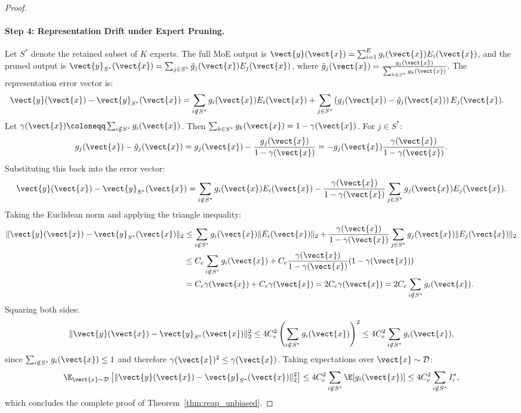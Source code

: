 \begin{proof}
\paragraph{Step 4: Representation Drift under Expert Pruning.}
Let $S^*$ denote the retained subset of $K$ experts.
The full MoE output is $\vect{y}(\vect{x}) = \sum_{i=1}^E g_i(\vect{x}) E_i(\vect{x})$, and the pruned output is $\vect{y}_{S^*}(\vect{x}) = \sum_{j \in S^*} \tilde{g}_j(\vect{x}) E_j(\vect{x})$, where $\tilde{g}_j(\vect{x}) = \frac{g_j(\vect{x})}{\sum_{k \in S^*} g_k(\vect{x})}$.
The representation error vector is:
\begin{align}
\vect{y}(\vect{x}) - \vect{y}_{S^*}(\vect{x}) &= \sum_{i \notin S^*} g_i(\vect{x}) E_i(\vect{x}) + \sum_{j \in S^*} \left( g_j(\vect{x}) - \tilde{g}_j(\vect{x}) \right) E_j(\vect{x}).
\end{align}
Let $\gamma(\vect{x}) \coloneqq \sum_{i \notin S^*} g_i(\vect{x})$. Then $\sum_{k \in S^*} g_k(\vect{x}) = 1 - \gamma(\vect{x})$.
For $j \in S^*$:
\begin{equation}
g_j(\vect{x}) - \tilde{g}_j(\vect{x}) = g_j(\vect{x}) - \frac{g_j(\vect{x})}{1 - \gamma(\vect{x})} = -g_j(\vect{x}) \frac{\gamma(\vect{x})}{1 - \gamma(\vect{x})}.
\end{equation}
Substituting this back into the error vector:
\begin{equation}
\vect{y}(\vect{x}) - \vect{y}_{S^*}(\vect{x}) = \sum_{i \notin S^*} g_i(\vect{x}) E_i(\vect{x}) - \frac{\gamma(\vect{x})}{1 - \gamma(\vect{x})} \sum_{j \in S^*} g_j(\vect{x}) E_j(\vect{x}).
\end{equation}
Taking the Euclidean norm and applying the triangle inequality:
\begin{align}
\|\vect{y}(\vect{x}) - \vect{y}_{S^*}(\vect{x})\|_2 &\le \sum_{i \notin S^*} g_i(\vect{x}) \|E_i(\vect{x})\|_2 + \frac{\gamma(\vect{x})}{1 - \gamma(\vect{x})} \sum_{j \in S^*} g_j(\vect{x}) \|E_j(\vect{x})\|_2 \nonumber \\
&\le C_e \sum_{i \notin S^*} g_i(\vect{x}) + C_e \frac{\gamma(\vect{x})}{1 - \gamma(\vect{x})} (1 - \gamma(\vect{x})) \nonumber \\
&= C_e \gamma(\vect{x}) + C_e \gamma(\vect{x}) = 2 C_e \gamma(\vect{x}) = 2 C_e \sum_{i \notin S^*} g_i(\vect{x}).
\end{align}
Squaring both sides:
\begin{equation}
\|\vect{y}(\vect{x}) - \vect{y}_{S^*}(\vect{x})\|_2^2 \le 4 C_e^2 \left( \sum_{i \notin S^*} g_i(\vect{x}) \right)^2 \le 4 C_e^2 \sum_{i \notin S^*} g_i(\vect{x}),
\end{equation}
since $\sum_{i \notin S^*} g_i(\vect{x}) \le 1$ and therefore $\gamma(\vect{x})^2 \le \gamma(\vect{x})$.
Taking expectations over $\vect{x} \sim \mathcal{D}$:
\begin{equation}
\E_{\vect{x} \sim \mathcal{D}}\left[ \|\vect{y}(\vect{x}) - \vect{y}_{S^*}(\vect{x})\|_2^2 \right] \le 4 C_e^2 \sum_{i \notin S^*} \E[g_i(\vect{x})] \le 4 C_e^2 \sum_{i \notin S^*} I_i^*,
\end{equation}
which concludes the complete proof of Theorem~\ref{thm:reap_unbiased}.
\end{proof}

